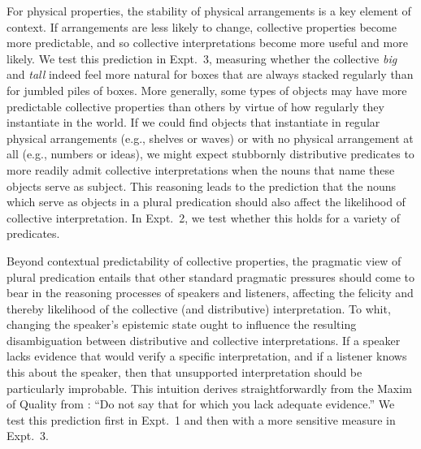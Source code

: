 \documentclass[linguex]{sp}
\newcommand{\ndg}[1]{\textcolor{Green}{[ndg: #1]}}
\newcommand{\gcs}[1]{\textcolor{blue}{[gcs: #1]}}
\begin{document}
For physical properties, the stability of physical arrangements is a key element of context. If arrangements are less likely to change, collective properties become more predictable, and so collective interpretations become more useful and more likely. 
We test this prediction in Expt.~3, measuring whether the collective \emph{big} and \emph{tall} indeed feel more natural for boxes that are always stacked regularly than for jumbled piles of boxes.
More generally, some types of objects may have more predictable collective properties than others by virtue of how regularly they instantiate in the world.  If we could find objects that instantiate in regular physical arrangements (e.g., shelves or waves) or with no physical arrangement at all (e.g., numbers or ideas), we might expect stubbornly distributive predicates to more readily admit collective interpretations when the nouns that name these objects serve as subject.
This reasoning leads to the prediction that the nouns which serve as objects in a plural predication should also affect the likelihood of collective interpretation. %
In Expt.~2, we test whether this holds for a variety of predicates.

Beyond contextual predictability of collective properties, the pragmatic view of plural predication entails that other standard pragmatic pressures should come to bear in the reasoning processes of speakers and listeners, affecting the felicity and thereby likelihood of the collective (and distributive) interpretation.
To whit, changing the speaker's epistemic state ought to influence the resulting disambiguation between distributive and collective interpretations. 
If a speaker lacks evidence that would verify a specific interpretation, and if a listener knows this about the speaker, then that unsupported interpretation should be particularly improbable. This intuition derives straightforwardly from the Maxim of Quality from \cite{grice1975}: ``Do not say that for which you lack adequate evidence.'' 
We test this prediction first in Expt.~1 and then with a more sensitive measure in Expt.~3.

\end{document}
